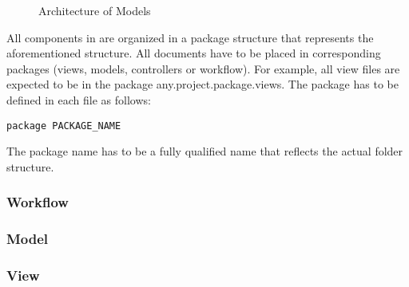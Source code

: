 
\begin{figure}[htb!]
\centering
{}
\caption{Architecture of \MD Models}
\label{fig:MD2Arch}
\end{figure}

All components in \MD are organized in a package structure that represents the aforementioned structure. All documents have to be placed in corresponding packages (views, models, controllers or workflow). For example, all view files are expected to be in the package any.project.package.views. The package has to be defined in each \MD file as follows:
\begin{lstlisting}
package PACKAGE_NAME
\end{lstlisting}
The package name has to be a fully qualified name that reflects the actual folder structure.

\subsubsection{Workflow} 
\label{subsubsec:Workflow}


\subsubsection{Model} 
\label{subsubsec:Model}


\subsubsection{View} 
\label{subsubsec:View}


